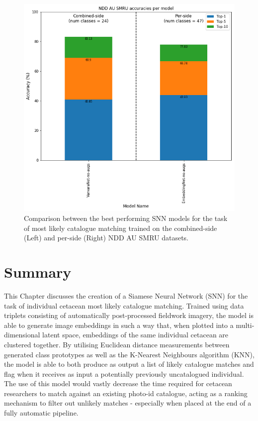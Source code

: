 \begin{figure}
	\begin{center}
		\includegraphics[scale=0.4]{Chapter5/figs/NDDAUSMRU-combined-and-per-side-comparison.png}
	\end{center}
	\caption{Comparison between the best performing SNN models for the task of most likely catalogue matching trained on the combined-side (Left) and per-side (Right) NDD AU SMRU datasets.}
	\label{fig:NDDAUSMRU-combined-and-per-side-comparison-individual-classification-only}
\end{figure}

\section{Summary}\label{ch:ID,sec:Summary}

This Chapter discusses the creation of a Siamese Neural Network (SNN) for the task of individual cetacean most likely catalogue matching. Trained using data triplets consisting of automatically post-processed fieldwork imagery, the model is able to generate image embeddings in such a way that, when plotted into a multi-dimensional latent space, embeddings of the same individual cetacean are clustered together. By utilising Euclidean distance measurements between generated class prototypes as well as the K-Nearest Neighbours algorithm (KNN), the model is able to both produce as output a list of likely catalogue matches and flag when it receives as input a potentially previously uncatalogued individual. The use of this model would vastly decrease the time required for cetacean researchers to match against an existing photo-id catalogue, acting as a ranking mechanism to filter out unlikely matches - especially when placed at the end of a fully automatic pipeline.

